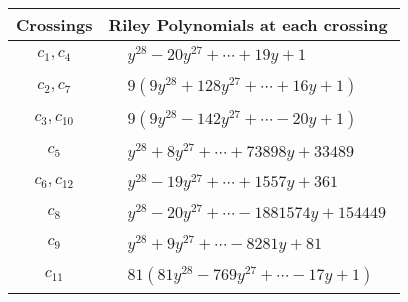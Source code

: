\documentclass[1p]{elsarticle_modified}
\theoremstyle{definition}
\begin{document}
\begin{tabular}{m{50pt}|m{274pt}}
Crossings & \hspace{64pt}Riley Polynomials at each crossing \\
\hline $$\begin{aligned}c_{1},c_{4}\end{aligned}$$&$\begin{aligned}
&y^{28}-20 y^{27}+\cdots+19 y+1
\end{aligned}$\\
\hline $$\begin{aligned}c_{2},c_{7}\end{aligned}$$&$\begin{aligned}
&9(9 y^{28}+128 y^{27}+\cdots+16 y+1)
\end{aligned}$\\
\hline $$\begin{aligned}c_{3},c_{10}\end{aligned}$$&$\begin{aligned}
&9(9 y^{28}-142 y^{27}+\cdots-20 y+1)
\end{aligned}$\\
\hline $$\begin{aligned}c_{5}\end{aligned}$$&$\begin{aligned}
&y^{28}+8 y^{27}+\cdots+73898 y+33489
\end{aligned}$\\
\hline $$\begin{aligned}c_{6},c_{12}\end{aligned}$$&$\begin{aligned}
&y^{28}-19 y^{27}+\cdots+1557 y+361
\end{aligned}$\\
\hline $$\begin{aligned}c_{8}\end{aligned}$$&$\begin{aligned}
&y^{28}-20 y^{27}+\cdots-1881574 y+154449
\end{aligned}$\\
\hline $$\begin{aligned}c_{9}\end{aligned}$$&$\begin{aligned}
&y^{28}+9 y^{27}+\cdots-8281 y+81
\end{aligned}$\\
\hline $$\begin{aligned}c_{11}\end{aligned}$$&$\begin{aligned}
&81(81 y^{28}-769 y^{27}+\cdots-17 y+1)
\end{aligned}$\\
\hline
\end{tabular}\\~\\
\end{document}
